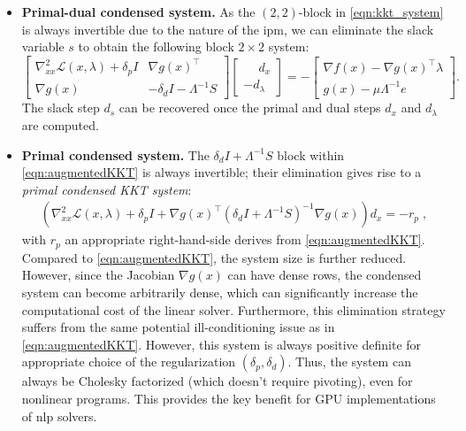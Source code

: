 \documentclass{article}
\begin{document}
\begin{itemize}[leftmargin=*,itemsep=0pt,parsep=0pt,partopsep=0pt]
\item \textbf{Primal-dual condensed system.}
As the $(2,2)$-block in \cref{eqn:kkt_system} is always invertible due to the nature of the \gls*{ipm}, we can eliminate the slack variable $s$ to obtain the following block $2\times 2$ system:
\begin{equation}\label{eqn:augmentedKKT}
  \begin{bmatrix}
    \nabla^2_{x x} \mathcal{L}(x,\lambda) + \delta_p I & \nabla g(x)^\top \\
    \nabla g(x) &  - \delta_d I - \Lambda^{-1} S
  \end{bmatrix}
  \begin{bmatrix}
    \phantom{-}d_x\\
    - d_\lambda
  \end{bmatrix} =
  -\begin{bmatrix}
    \nabla f(x) - \nabla g(x)^\top \lambda\\
    g(x) - \mu \Lambda^{-1} e
  \end{bmatrix}.
\end{equation}
The slack step $d_s$ can be recovered once the primal and dual steps $d_x$ and $d_\lambda$ are computed.

\item \textbf{Primal condensed system.}
The $ \delta_d I + \Lambda^{-1}S $ block within \eqref{eqn:augmentedKKT} is always invertible; their elimination gives rise to a \emph{primal condensed KKT system}:
\begin{align}\label{eqn:kkt_primal}
  \left(\nabla^2_{x x} \mathcal{L}(x, \lambda) + \delta_p I + \nabla g(x)^\top (\delta_d I + \Lambda^{-1} S)^{-1} \nabla g(x)  \right) d_x = - r_p \; ,
\end{align}
with $r_p$ an appropriate right-hand-side derives from \eqref{eqn:augmentedKKT}.
Compared to \cref{eqn:augmentedKKT}, the system size is further reduced.
However, since the Jacobian $\nabla g(x)$ can have dense rows, the condensed system can become arbitrarily dense, which can significantly increase the computational cost of the linear solver. Furthermore, this elimination strategy suffers from the same potential ill-conditioning issue as in \cref{eqn:augmentedKKT}.
However, this system is always positive definite for appropriate choice of the
regularization $(\delta_p, \delta_d)$.
Thus, the system can always be Cholesky factorized (which doesn't require pivoting), even for nonlinear programs.
This provides the key benefit for GPU implementations of \gls*{nlp} solvers.


\end{itemize}
\end{document}

